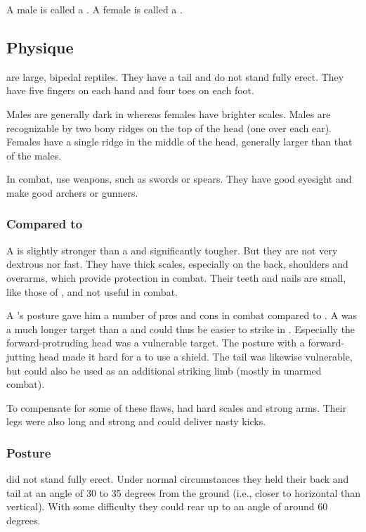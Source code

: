A male \scatha{} is called a \dax. 
A female is called a \sphyle. 









\subsection{Physique}
\Scathae{} are large, bipedal reptiles. 
They have a tail and do not stand fully erect. 
They have five fingers on each hand and four toes on each foot. 

Males are generally dark in \colour whereas females have brighter scales. Males are recognizable by two bony ridges on the top of the head (one over each ear). Females have a single ridge in the middle of the head, generally larger than that of the males. 

In combat, \scathae{} use weapons, such as swords or spears. They have good eyesight and make good archers or gunners. 





\subsubsection{Compared to \humans}

A \scatha{} is slightly stronger than a \human and significantly tougher. 
But they are not very dextrous nor fast. 
They have thick scales, especially on the back, shoulders and overarms, which provide protection in combat. 
Their teeth and nails are small, like those of \humans, and not useful in combat. 

A \scatha's posture gave him a number of pros and cons in combat compared to \humans. 
A \scatha was a much longer target than a \human and could thus be easier to strike in \melee.
Especially the forward-protruding head was a vulnerable target. 
The posture with a forward-jutting head made it hard for a \scatha to use a shield. 
The tail was likewise vulnerable, but could also be used as an additional striking limb (mostly in unarmed combat).

To compensate for some of these flaws, \scathae had hard scales and strong arms. 
Their legs were also long and strong and could deliver nasty kicks. 





\subsubsection{Posture}
\Scathae did not stand fully erect. 
Under normal circumstances they held their back and tail at an angle of 30 to 35 degrees from the ground (i.e., closer to horizontal than vertical). 
With some difficulty they could rear up to an angle of around 60 degrees. 

